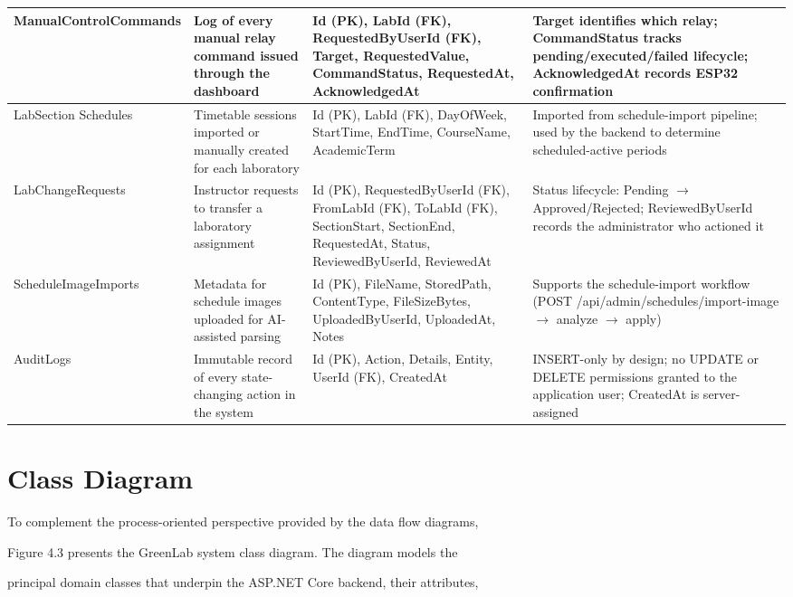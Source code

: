 \begin{longtable}{|L{2.5cm}|L{3.0cm}|L{5.0cm}|L{3.5cm}|}
\hline
ManualControl\newline Commands & Log of every manual relay command issued through the dashboard & Id (PK), LabId (FK), RequestedByUserId (FK), Target, RequestedValue, CommandStatus, RequestedAt, AcknowledgedAt & Target identifies which relay; CommandStatus tracks pending/executed/failed lifecycle; AcknowledgedAt records ESP32 confirmation \\
\hline
LabSection \newline Schedules & Timetable sessions imported or manually created for each laboratory & Id (PK), LabId (FK), DayOfWeek, StartTime, EndTime, CourseName, AcademicTerm & Imported from schedule-import pipeline; used by the backend to determine scheduled-active periods \\
\hline
LabChange\newline Requests & Instructor requests to transfer a laboratory assignment & Id (PK), RequestedByUserId (FK), FromLabId (FK), ToLabId (FK), SectionStart, SectionEnd, RequestedAt, Status, ReviewedByUserId, ReviewedAt & Status lifecycle: Pending $\rightarrow$ Approved/Rejected; ReviewedByUserId records the administrator who actioned it \\
\hline
ScheduleImage\newline Imports & Metadata for schedule images uploaded for AI-assisted parsing & Id (PK), FileName, StoredPath, ContentType, FileSizeBytes, UploadedByUserId, UploadedAt, Notes & Supports the schedule-import workflow (POST /api/admin/schedules\newline /import-image $\rightarrow$ analyze $\rightarrow$ apply) \\
\hline
AuditLogs & Immutable record of every state-changing action in the system & Id (PK), Action, Details, Entity, UserId (FK), CreatedAt & INSERT-only by design; no UPDATE or DELETE permissions granted to the application user; CreatedAt is server-assigned \\
\hline
\end{longtable}


\section{Class Diagram}
To complement the process-oriented perspective provided by the data flow diagrams,

Figure 4.3 presents the GreenLab system class diagram. The diagram models the

principal domain classes that underpin the ASP.NET Core backend, their attributes,


